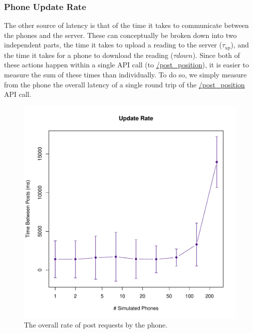 \documentclass{acm_proc_article-sp}
\begin{document}
\subsubsection{Phone Update Rate}
The other source of latency is that of the time it takes to communicate between the phones and the server. These can conceptually be broken down into two independent parts, the time it takes to upload a reading to the server  ($\tau_{up}$), and the time it takes for a phone to download the reading ($\tau{down}$). Since both of these actions happen within a single API call (to \url{/post_position}), it is easier to measure the sum of these times than individually. To do so, we simply measure from the phone the overall latency of a single round trip of the \url{/post_position} API call.

\begin{figure}
\centering
\includegraphics[scale=0.5]{figs/phoneUpdateRate}
\caption{The overall rate of post requests by the phone.}
\label{fig:phoneUpdateRate}
\end{figure}
\end{document}
